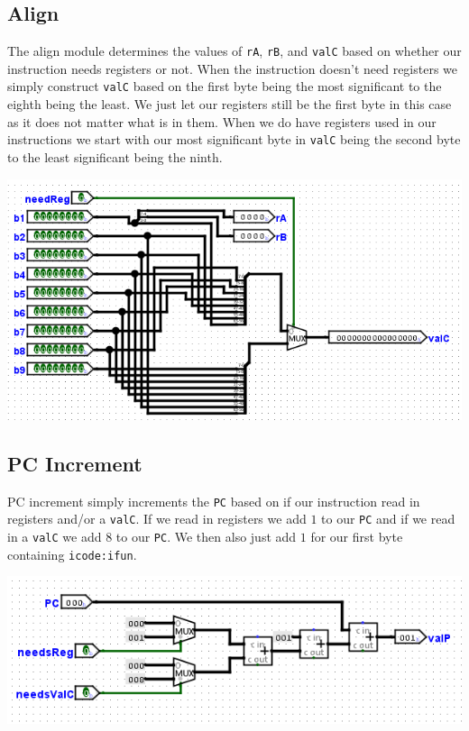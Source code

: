 \documentclass{article}
\begin{document}
\subsection{Align}
The align module determines the values of \verb+rA+, \verb+rB+, and \verb+valC+ based on whether our instruction needs registers or not. When the instruction doesn't need registers we simply construct  \verb+valC+ based on the first byte being the most significant to the eighth being the least. We just let our registers still be the first byte in this case as it does not matter what is in them. When we do have registers used in our instructions we start with our most significant byte in \verb+valC+ being the second byte to the least significant being the ninth.
\begin{center}
    \includegraphics[scale=.7]{align.png}
\end{center}
\subsection{PC Increment}
PC increment simply increments the \verb+PC+ based on if our instruction read in registers and/or a \verb+valC+. If we read in registers we add $1$ to our \verb+PC+ and if we read in a \verb+valC+ we add $8$ to our \verb+PC+. We then also just add $1$ for our first byte containing  \verb+icode:ifun+.
\begin{center}
    \includegraphics[scale=.5]{pcInc.png}
\end{center}
\end{document}

